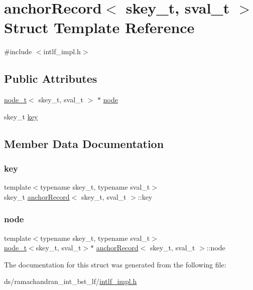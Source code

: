\hypertarget{structanchorRecord}{}\section{anchor\+Record$<$ skey\+\_\+t, sval\+\_\+t $>$ Struct Template Reference}
\label{structanchorRecord}


{\ttfamily \#include $<$intlf\+\_\+impl.\+h$>$}

\subsection*{Public Attributes}
\begin{DoxyCompactItemize}
\item 
\hyperlink{structnode__t}{node\+\_\+t}$<$ skey\+\_\+t, sval\+\_\+t $>$ $\ast$ \hyperlink{structanchorRecord_a8061a070a75e5f9bb2e2f5e2969ce641}{node}
\item 
skey\+\_\+t \hyperlink{structanchorRecord_ae14bc8e64efbe368ad6c511b5272b96f}{key}
\end{DoxyCompactItemize}


\subsection{Member Data Documentation}
\mbox{\label{structanchorRecord_ae14bc8e64efbe368ad6c511b5272b96f}} 
\subsubsection{\texorpdfstring{key}{key}}
{\footnotesize\ttfamily template$<$typename skey\+\_\+t, typename sval\+\_\+t$>$ \\
skey\+\_\+t \hyperlink{structanchorRecord}{anchor\+Record}$<$ skey\+\_\+t, sval\+\_\+t $>$\+::key}

\mbox{\label{structanchorRecord_a8061a070a75e5f9bb2e2f5e2969ce641}} 
\subsubsection{\texorpdfstring{node}{node}}
{\footnotesize\ttfamily template$<$typename skey\+\_\+t, typename sval\+\_\+t$>$ \\
\hyperlink{structnode__t}{node\+\_\+t}$<$skey\+\_\+t, sval\+\_\+t$>$$\ast$ \hyperlink{structanchorRecord}{anchor\+Record}$<$ skey\+\_\+t, sval\+\_\+t $>$\+::node}



The documentation for this struct was generated from the following file\+:\begin{DoxyCompactItemize}
\item 
ds/ramachandran\+\_\+int\+\_\+bst\+\_\+lf/\hyperlink{intlf__impl_8h}{intlf\+\_\+impl.\+h}\end{DoxyCompactItemize}
